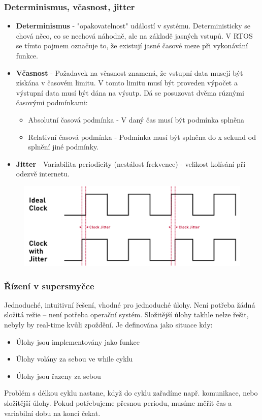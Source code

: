 \subsubsection*{Determinismus, včasnost, jitter}
\begin{itemize}
    \item \textbf{Determinismus} - "opakovatelnost" událostí v systému. Deterministicky se chová něco, co se nechová náhodně, ale na základě jasných vstupů. V RTOS se tímto pojmem označuje to, že existují jasné časové meze při vykonávání funkce.
    \item  \textbf{Včasnost} - Požadavek na včasnost znamená, že vstupní data musejí být získána v časovém limitu. V tomto limitu musí být proveden výpočet a výstupní data musí být dána na výsutp. Dá se posuzovat dvěma rúznými časovými podmínkami: \begin{itemize}
              \item Absolutní časová podmínka - V daný čas musí být podmínka splněna
              \item Relativní časová podmínka - Podmínka musí být splněna do x sekund od splnění jiné podmínky.
          \end{itemize}
    \item \textbf{Jitter} - Variabilita periodicity (nestálost frekvence) - velikost kolísání při odezvě internetu.
\end{itemize}

\begin{figure}[h]
    \begin{center}
        \includegraphics[scale = 1]{img/Picture24.png}
    \end{center}
\end{figure}

\subsubsection*{Řízení v supersmyčce}
Jednoduché, intuitivní řešení, vhodné pro jednoduché úlohy. Není potřeba žádná složitá režie – není potřeba operační systém. Složitější úlohy takhle nelze řešit, nebyly by real-time kvůli zpoždění.
Je definována jako situace kdy:
\begin{itemize}
    \item Úlohy jsou implementovány jako funkce
    \item Úlohy volány za sebou ve while cyklu
    \item Úlohy jsou řazeny za sebou
\end{itemize}
Problém s délkou cyklu nastane, když do cyklu zařadíme např. komunikace, nebo složitější úlohy.
Pokud potřebujeme přesnou periodu, musíme měřit čas a variabilní dobu na konci čekat.

